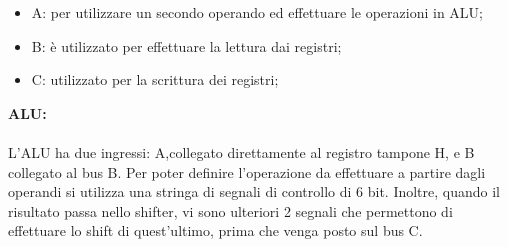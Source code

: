 \documentclass[12pt]{article}
\begin{document}
\begin{itemize}
    \item A: per utilizzare un secondo operando ed effettuare le operazioni in ALU;
    \item B: è utilizzato per effettuare la lettura dai registri;
    \item C: utilizzato per la scrittura dei registri;
\end{itemize}
{\large \textbf{ALU:}}
\\\\L’ALU ha due ingressi: A,collegato direttamente al registro tampone H, e B collegato al bus B. Per poter definire l’operazione da effettuare a partire dagli operandi si utilizza una stringa di segnali di controllo di 6 bit. Inoltre, quando il risultato passa nello shifter, vi sono ulteriori 2 segnali che permettono di effettuare lo shift di quest’ultimo, prima che venga posto sul bus C.
\clearpage
\end{document}
